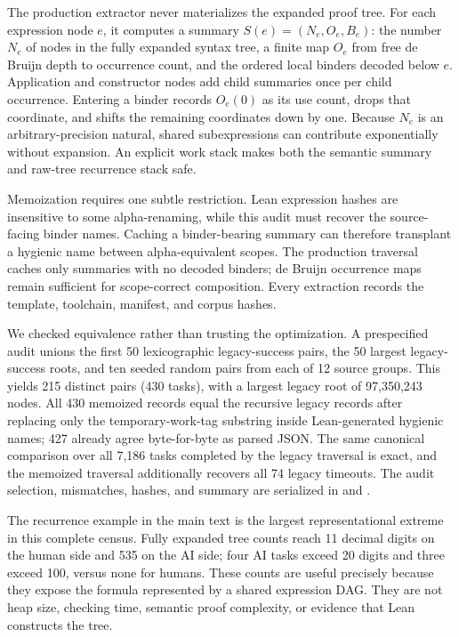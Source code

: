 \documentclass[10pt]{article}
\begin{document}
The production extractor never materializes the expanded proof tree.  For each expression node
$e$, it computes a summary $S(e)=(N_e,O_e,B_e)$: the number $N_e$ of nodes in the fully expanded
syntax tree, a finite map $O_e$ from free de Bruijn depth to occurrence count, and the ordered local
binders decoded below $e$.  Application and constructor nodes add child summaries once per child
occurrence.  Entering a binder records $O_e(0)$ as its use count, drops that coordinate, and shifts
the remaining coordinates down by one.  Because $N_e$ is an arbitrary-precision natural, shared
subexpressions can contribute exponentially without expansion.  An explicit work stack makes both
the semantic summary and raw-tree recurrence stack safe.

Memoization requires one subtle restriction.  Lean expression hashes are insensitive to some
alpha-renaming, while this audit must recover the source-facing binder names.  Caching a
binder-bearing summary can therefore transplant a hygienic name between alpha-equivalent scopes.
The production traversal caches only summaries with no decoded binders; de Bruijn occurrence maps
remain sufficient for scope-correct composition.  Every extraction records the template,
toolchain, manifest, and corpus hashes.

We checked equivalence rather than trusting the optimization.  A prespecified audit unions the
first 50 lexicographic legacy-success pairs, the 50 largest legacy-success roots, and ten seeded
random pairs from each of 12 source groups.  This yields 215 distinct pairs (430 tasks), with a
largest legacy root of 97,350,243 nodes.  All 430 memoized records equal the recursive legacy
records after replacing only the temporary-work-tag substring inside Lean-generated hygienic
names; 427 already agree byte-for-byte as parsed JSON.  The same canonical comparison over all
7,186 tasks completed by the legacy traversal is exact, and the memoized traversal additionally
recovers all 74 legacy timeouts.  The audit selection, mismatches, hashes, and summary are serialized
in  and
.

The recurrence example in the main text is the largest representational extreme in this complete
census.  Fully expanded tree counts reach 11 decimal digits on the human side and 535 on the AI
side; four AI tasks exceed 20 digits and three exceed 100, versus none for humans.  These counts are
useful precisely because they expose the formula represented by a shared expression DAG.  They are
not heap size, checking time, semantic proof complexity, or evidence that Lean constructs the tree.
\end{document}
